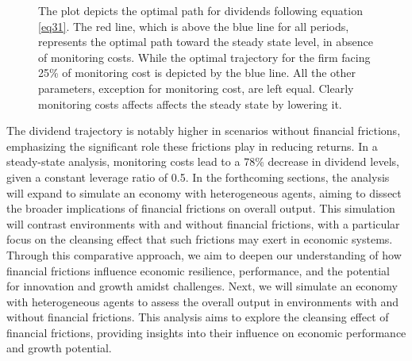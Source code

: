 \documentclass[12pt]{report}
\begin{document}
\begin{figure}[H]
    \centering
    \caption{The plot depicts the optimal path for dividends following equation \ref{eq31}. The red line, which is above
    the blue line for all periods, represents the optimal path toward the steady state level, in absence of
    monitoring costs. While the optimal trajectory for the firm facing 25\% of monitoring cost is depicted by the blue
    line. All the other parameters, exception for monitoring cost, are left equal. Clearly monitoring costs affects
    affects the steady state by lowering it.}
    \label{fig:dividendsEvolution}
\end{figure}

The dividend trajectory is notably higher in scenarios without financial frictions, emphasizing the significant role
these frictions play in reducing returns. In a steady-state analysis, monitoring costs lead to a 78\% decrease in
dividend levels, given a constant leverage ratio of 0.5. 
In the forthcoming sections, the analysis will expand to simulate an economy with heterogeneous agents, aiming to
dissect the broader implications of financial frictions on overall output. This simulation will contrast environments
with and without financial frictions, with a particular focus on the cleansing effect that such frictions may exert in
economic systems. Through this comparative approach, we aim to deepen our understanding of how financial frictions
influence economic resilience, performance, and the potential for innovation and growth amidst challenges. 
Next, we will simulate an economy with heterogeneous agents to assess the overall output in environments with and without financial frictions. This analysis aims to explore the cleansing effect of financial frictions, providing insights into their influence on economic performance and growth potential.
\end{document}
